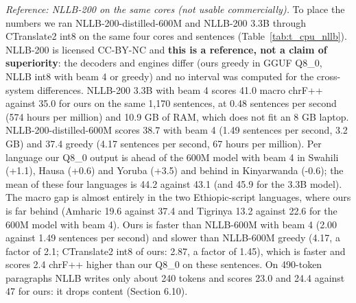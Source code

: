 \emph{Reference: NLLB-200 on the same cores (not usable commercially).} To place the numbers we ran NLLB-200-distilled-600M and NLLB-200 3.3B through CTranslate2 int8 on the same four cores and sentences (Table~\ref{tab:t_cpu_nllb}). NLLB-200 is licensed CC-BY-NC and \textbf{this is a reference, not a claim of superiority}: the decoders and engines differ (ours greedy in GGUF Q8\_0, NLLB int8 with beam 4 or greedy) and no interval was computed for the cross-system differences. NLLB-200 3.3B with beam 4 scores 41.0 macro chrF++ against 35.0 for ours on the same 1,170 sentences, at 0.48 sentences per second (574 hours per million) and 10.9 GB of RAM, which does not fit an 8 GB laptop. NLLB-200-distilled-600M scores 38.7 with beam 4 (1.49 sentences per second, 3.2 GB) and 37.4 greedy (4.17 sentences per second, 67 hours per million). Per language our Q8\_0 output is ahead of the 600M model with beam 4 in Swahili (+1.1), Hausa (+0.6) and Yoruba (+3.5) and behind in Kinyarwanda (-0.6); the mean of these four languages is 44.2 against 43.1 (and 45.9 for the 3.3B model). The macro gap is almost entirely in the two Ethiopic-script languages, where ours is far behind (Amharic 19.6 against 37.4 and Tigrinya 13.2 against 22.6 for the 600M model with beam 4). Ours is faster than NLLB-600M with beam 4 (2.00 against 1.49 sentences per second) and slower than NLLB-600M greedy (4.17, a factor of 2.1; CTranslate2 int8 of ours: 2.87, a factor of 1.45), which is faster and scores 2.4 chrF++ higher than our Q8\_0 on these sentences. On 490-token paragraphs NLLB writes only about 240 tokens and scores 23.0 and 24.4 against 47 for ours: it drops content (Section 6.10).

